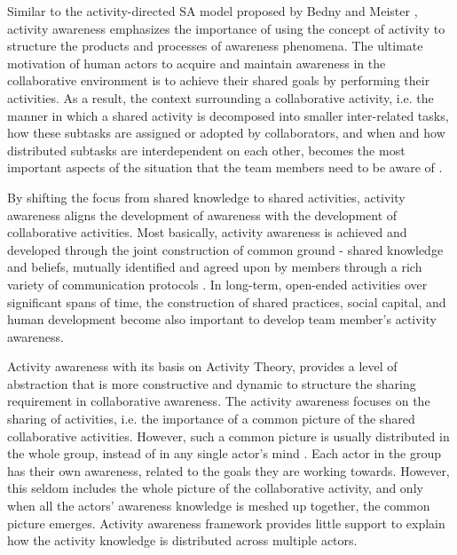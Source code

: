 Similar to the activity-directed SA model proposed by Bedny and Meister \cite{Bedny1999}, activity awareness emphasizes the importance of using the concept of activity to structure the products and processes of awareness phenomena. The ultimate motivation of human actors to acquire and maintain awareness in the collaborative environment is to achieve their shared goals by performing their activities. As a result, the context surrounding a collaborative activity, i.e. the manner in which a shared activity is decomposed into smaller inter-related tasks, how these subtasks are assigned or adopted by collaborators, and when and how distributed subtasks are interdependent on each other, becomes the most important aspects of the situation that the team members need to be aware of \cite{carroll2003a}.

By shifting the focus from shared knowledge to shared activities, activity awareness aligns the development of awareness with the development of collaborative activities. Most basically, activity awareness is achieved and developed through the joint construction of common ground - shared knowledge and beliefs, mutually identified and agreed upon by members through a rich variety of communication protocols \cite{carroll2006a}. In long-term, open-ended activities over significant spans of time, the construction of shared practices, social capital, and human development become also important to develop team member's activity awareness.

Activity awareness with its basis on Activity Theory, provides a level of abstraction that is more constructive and dynamic to structure the sharing requirement in collaborative awareness. The activity awareness focuses on the sharing of activities, i.e. the importance of a common picture of the shared collaborative activities. However, such a common picture is usually distributed in the whole group, instead of in any single actor's mind \cite{Stanton2009}. Each actor in the group has their own awareness, related to the goals they are working towards. However, this seldom includes the whole picture of the collaborative activity, and only when all the actors' awareness knowledge is meshed up together, the common picture emerges. Activity awareness framework provides little support to explain how the activity knowledge is distributed across multiple actors.

